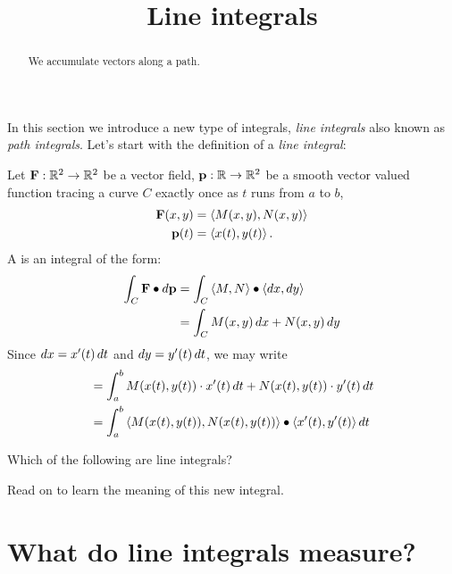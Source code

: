 \documentclass{ximera}
\title[Dig-In:]{Line integrals}
\begin{document}
\begin{abstract}
We accumulate vectors along a path.
\end{abstract}
\maketitle

In this section we introduce a new type of integrals, \textit{line
  integrals} also known as \textit{path integrals}. Let's start with
the definition of a \textit{line integral}:


\begin{definition}
Let $\mathbf{F}:\mathbb R^2\to\mathbb R^2$ be a vector field, $\mathbf{p}:\mathbb R\to\mathbb R^2$ be a
smooth vector valued function tracing a curve $C$ exactly once as $t$
runs from $a$ to $b$,
\begin{align*}
  \mathbf{F}(x,y) &= \left\langle M(x,y), N(x,y)\right\rangle\\
  \mathbf{p}(t) &= \left\langle x(t),y(t)\right\rangle.
\end{align*}
A  is an integral of the form:
\begin{align*}
\int_C \mathbf{F}\bullet \mathop{}\!d \mathbf{p} &= \int_C \left\langle M,N\right\rangle\bullet\left\langle \mathop{}\!d x,\mathop{}\!d y\right\rangle\\
&= \int_C M(x,y)\mathop{}\!d x + N(x,y)\mathop{}\!d y
\end{align*}
Since $\mathop{}\!d x = x'(t)\mathop{}\!d t$ and $\mathop{}\!d y = y'(t)\mathop{}\!d t$, we may write
\begin{align*}
&= \int_a^b M(x(t),y(t))\cdot x'(t) \mathop{}\!d t + N(x(t),y(t))\cdot  y'(t) \mathop{}\!d t\\
&= \int_a^b \left\langle M(x(t),y(t)),N(x(t),y(t))\right\rangle\bullet\left\langle x'(t), y'(t)\right\rangle \mathop{}\!d t
\end{align*}
\end{definition}

\begin{question}
  Which of the following are line integrals?
  \begin{selectAll}
  \end{selectAll}
\end{question}

Read on to learn the meaning of this new integral.


\section{What do line integrals measure?}
\end{document}
